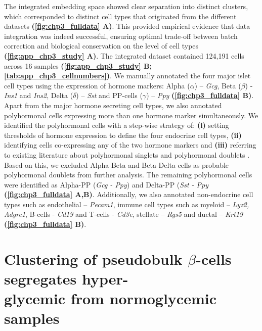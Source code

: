 
\par The integrated embedding space showed clear separation into distinct clusters, which corresponded to distinct cell types that originated from the different datasets \textbf{(\autoref{fig:chp3_fulldata} A)}. This provided empirical evidence that data integration was indeed successful, ensuring optimal trade-off between batch correction and biological conservation on the level of cell types \textbf{(\autoref{fig:app_chp3_study} A)}. The integrated dataset contained 124,191 cells across 16 samples \textbf{(\autoref{fig:app_chp3_study} B; \autoref{tab:app_chp3_cellnumbers})}. We manually annotated the four major islet cell types using the expression of hormone markers: Alpha ($\alpha$) – \textit{Gcg}, Beta ($\beta$) - \textit{Ins1} and \textit{Ins2}, Delta ($\delta$) – \textit{Sst} and PP-cells ($\gamma$) – \textit{Ppy} \textbf{(\autoref{fig:chp3_fulldata} B)}. Apart from the major hormone secreting cell types, we also annotated polyhormonal cells expressing more than one hormone marker simultaneously. We identified the polyhormonal cells with a step-wise strategy of: \textbf{(i)} setting thresholds of hormone expression to define the four endocrine cell types, \textbf{(ii)} identifying cells co-expressing any of the two hormone markers and \textbf{(iii)} referring to existing literature about polyhormonal singlets and polyhormonal doublets \textbf{\cite{sachs_targeted_2020, perez-frances_pancreatic_2021}}. Based on this, we excluded Alpha-Beta and Beta-Delta cells as probable polyhormonal doublets from further analysis. The remaining polyhormonal cells were identified as Alpha-PP (\textit{Gcg - Ppy}) and Delta-PP (\textit{Sst - Ppy} \textbf{(\autoref{fig:chp3_fulldata} A,B)}. Additionally, we also annotated non-endocrine cell types such as endothelial – \textit{Pecam1}, immune cell types such as myeloid – \textit{Lyz2, Adgre1}, B-cells - \textit{Cd19} and T-cells - \textit{Cd3e}, stellate – \textit{Rgs5} and ductal – \textit{Krt19} \textbf{(\autoref{fig:chp3_fulldata} B)}.


\section[Clustering of pseudobulk $\beta$-cells segregates hyperglycemic from normoglycemic samples]{Clustering of pseudobulk $\beta$-cells segregates hyper-\\glycemic from normoglycemic samples}
\label{sec:chp3_pseudobulk}

